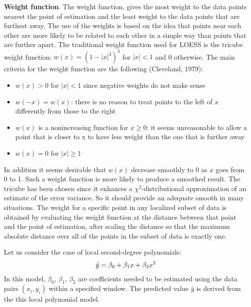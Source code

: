 \documentclass[color]{article}
\begin{document}
\textbf{Weight function}. The weight function, gives the most weight to the data points nearest the point of estimation and the least weight to the data points that are furthest away.
The use of the weights is based on the idea that points near each other are more likely to be related to each other in a simple way than points that are further apart.
The traditional weight function used for LOESS is the tricube weight function:
$w(x) = (1 - |x|^3)^3$ for $|x| < 1$ and 0 otherwise.
The main criteria for the weight function are the following (Cleveland, 1979):
\begin{itemize}
 \item $w(x) > 0$ for $|x| < 1$ since negative weights do not make sense
 \item $w(-x) = w(x)$: there is no reason to treat points to the left of $x$ differently from those to the right 
 \item $w(x)$ is a nonincreasing function for $x \geqslant 0$: it seems unreasonable to allow a point that is closer to x to have less weight than the one that is further
   away 
  \item $w(x) = 0$ for $|x| \geqslant 1$
\end{itemize}
%
In addition it seems desirable that $w(x)$ decrease smoothly to 0 as $x$ goes from 0
to 1. Such a weight function is more likely to produce a smoothed result. The tricube has been chosen since it enhances a $\chi^2$-distributional approximation of an estimate of the error variance. So it should provide an adequate smooth in 
many situations.
The weight for a specific point in any localized subset of data is obtained by 
evaluating the weight function at the distance between that point and the point 
of estimation, after scaling the distance so that the maximum absolute distance 
over all of the points in the subset of data is exactly one. 

Let us consider the case of local second-degree polynomials:
\begin{gather}
    \hat{y} = \beta_0 + \beta_1 x + \beta_2 x^2 \notag
\end{gather}
%
In this model, $\beta_0$, $\beta_1$, $\beta_2$ are coefficients needed to be estimated using the data pairs $(x_i, y_i)$ within a specified window. The predicted value $\hat{y}$ is derived from the this local polynomial model. 
\end{document}
